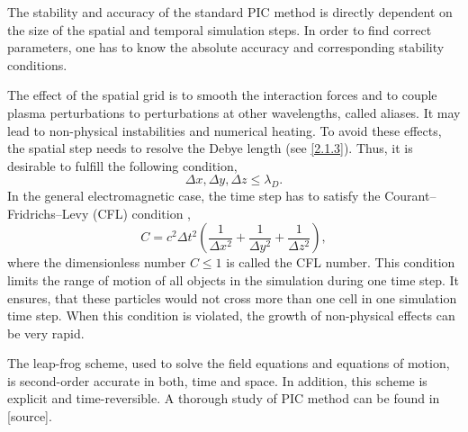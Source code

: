 The stability and accuracy of the standard PIC method is directly dependent on the size of the spatial and temporal simulation steps. In order to find correct parameters, one has to know the absolute accuracy and corresponding stability conditions.

The effect of the spatial grid is to smooth the interaction forces and to couple plasma perturbations to perturbations at other wavelengths, called aliases. It may lead to non-physical instabilities and numerical heating. To avoid these effects, the spatial step needs to resolve the Debye length (see \ref{2.1.3}). Thus, it is desirable to fulfill the following condition,
\begin{equation}
\Delta x, \Delta y, \Delta z \leq \lambda_{D}.
\end{equation}
In the general electromagnetic case, the time step has to satisfy the Courant--Fridrichs--Levy (CFL) condition \cite{jaroszynsky},
\begin{equation}
\label{3.1.4.1}
C = c^{2} \Delta t^{2} \left(\frac{1}{\Delta x^{2}} + \frac{1}{\Delta y^{2}} + \frac{1}{\Delta z^{2}}\right),
\end{equation}
where the dimensionless number $ C \leq 1 $ is called the CFL number. This condition limits the range of motion of all objects in the simulation during one time step. It ensures, that these particles would not cross more than one cell in one simulation time step. When this condition is violated, the growth of non-physical effects can be very rapid. 

The leap-frog scheme, used to solve the field equations and equations of motion, is second-order accurate in both, time and space. In addition, this scheme is explicit and time-reversible. A thorough study of PIC method can be found in [source].